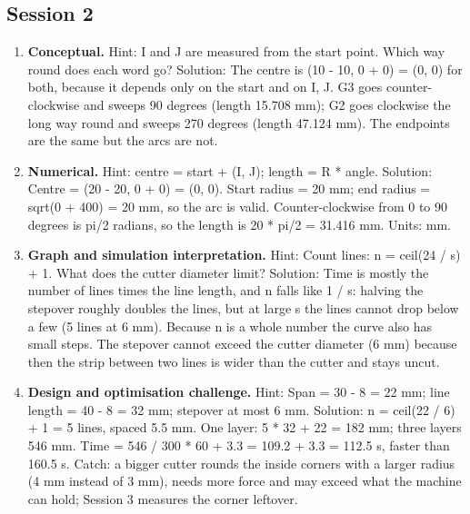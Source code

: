 \documentclass[11pt,a4paper]{article}
\begin{document}
\subsection*{Session 2}
\begin{enumerate}[nosep]
\item \textbf{Conceptual.} Hint: I and J are measured from the start point. Which way round does each word go? Solution: The centre is (10 - 10, 0 + 0) = (0, 0) for both, because it depends only on the start and on I, J. G3 goes counter-clockwise and sweeps 90 degrees (length 15.708 mm); G2 goes clockwise the long way round and sweeps 270 degrees (length 47.124 mm). The endpoints are the same but the arcs are not.
\item \textbf{Numerical.} Hint: centre = start + (I, J); length = R * angle. Solution: Centre = (20 - 20, 0 + 0) = (0, 0). Start radius = 20 mm; end radius = sqrt(0 + 400) = 20 mm, so the arc is valid. Counter-clockwise from 0 to 90 degrees is pi/2 radians, so the length is 20 * pi/2 = 31.416 mm. Units: mm.
\item \textbf{Graph and simulation interpretation.} Hint: Count lines: n = ceil(24 / s) + 1. What does the cutter diameter limit? Solution: Time is mostly the number of lines times the line length, and n falls like 1 / s: halving the stepover roughly doubles the lines, but at large s the lines cannot drop below a few (5 lines at 6 mm). Because n is a whole number the curve also has small steps. The stepover cannot exceed the cutter diameter (6 mm) because then the strip between two lines is wider than the cutter and stays uncut.
\item \textbf{Design and optimisation challenge.} Hint: Span = 30 - 8 = 22 mm; line length = 40 - 8 = 32 mm; stepover at most 6 mm. Solution: n = ceil(22 / 6) + 1 = 5 lines, spaced 5.5 mm. One layer: 5 * 32 + 22 = 182 mm; three layers 546 mm. Time = 546 / 300 * 60 + 3.3 = 109.2 + 3.3 = 112.5 s, faster than 160.5 s. Catch: a bigger cutter rounds the inside corners with a larger radius (4 mm instead of 3 mm), needs more force and may exceed what the machine can hold; Session 3 measures the corner leftover.
\end{enumerate}
\end{document}

